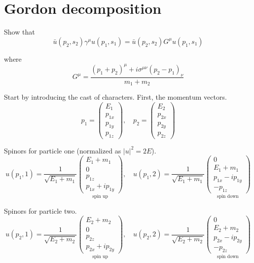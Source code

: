 

\section*{Gordon decomposition}

Show that
\begin{equation*}
\bar{u}(p_2,s_2)\gamma^\mu u(p_1,s_1)
=\bar{u}(p_2,s_2)G^\mu u(p_1,s_1)
\end{equation*}

where
\begin{equation*}
G^\mu=\frac{(p_1+p_2)^\mu+i\sigma^{\mu\nu}(p_2-p_1)_\nu}{m_1+m_2}
\end{equation*}

Start by introducing the cast of characters.
First, the momentum vectors.
\begin{equation*}
p_1=\begin{pmatrix}E_1\\p_{1x}\\p_{1y}\\p_{1z}\end{pmatrix},\quad
p_2=\begin{pmatrix}E_2\\p_{2x}\\p_{2y}\\p_{2z}\end{pmatrix}
\end{equation*}

Spinors for particle one (normalized as $|u|^2=2E$).
\begin{equation*}
u(p_1,1)=\frac{1}{\sqrt{E_1+m_1}}\underset{\text{spin up}}
{\begin{pmatrix}E_1+m_1\\0\\p_{1z}\\p_{1x}+ip_{1y}\end{pmatrix}},\quad
u(p_1,2)=\frac{1}{\sqrt{E_1+m_1}}\underset{\text{spin down}}
{\begin{pmatrix}0\\E_1+m_1\\p_{1x}-ip_{1y}\\-p_{1z}\end{pmatrix}}
\end{equation*}

Spinors for particle two.
\begin{equation*}
u(p_2,1)=\frac{1}{\sqrt{E_2+m_2}}\underset{\text{spin up}}
{\begin{pmatrix}E_2+m_2\\0\\p_{2z}\\p_{2x}+ip_{2y}\end{pmatrix}},\quad
u(p_2,2)=\frac{1}{\sqrt{E_2+m_2}}\underset{\text{spin down}}
{\begin{pmatrix}0\\E_2+m_2\\p_{2x}-ip_{2y}\\-p_{2z}\end{pmatrix}}
\end{equation*}

